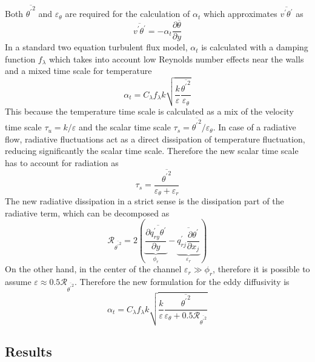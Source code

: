 \documentclass[10pt]{article}
\def\lp{\left(}
\def\rp{\right)}
\def\tp{\overline{{\theta^\prime}^2}}
\def\tm{\overline{\theta}}
\def\tr{{\theta^\prime}}
\def\et{{\varepsilon_{\theta}}}
\begin{document}
\noindent Both $\tp$ and $\et$ are required for the calculation of $\alpha_t$ which approximates $\overline{v^\prime \tr}$ as
\begin{equation*}
\overline{v^\prime \tr} = - \alpha_t \frac{\partial \tm}{\partial y}
\end{equation*}
In a standard two equation turbulent flux model, $\alpha_t$ is calculated with a damping function $f_{\lambda}$ which takes into account low Reynolds number effects near the walls and a mixed time scale for temperature
\begin{equation*}
\alpha_t = C_{\lambda} f_{\lambda} k \sqrt{\frac{k}{\varepsilon}\frac{\tp}{\et}}
\end{equation*} 
This because the temperature time scale is calculated as a mix of the velocity time scale $\tau_u= k/\varepsilon$ and the scalar time scale $\tau_s = \tp/\et$. In case of a radiative flow, radiative fluctuations act as a direct dissipation of temperature fluctuation, reducing significantly the scalar time scale. Therefore the new scalar time scale has to account for radiation as
\begin{equation*}
\tau_s = \frac{\tp}{\et + \varepsilon_r}
\end{equation*}
The new radiative dissipation in a strict sense is the dissipation part of the radiative term, which can be decomposed as
\begin{equation*}
\mathcal{R}_{\tp} = 2 \lp \underbrace{\frac{\partial \overline{q_{ry}^\prime \tr}}{\partial y}}_{\phi_r} - \underbrace{\overline{q_{rj}^\prime\frac{\partial \tr}{\partial x_j}}}_{\varepsilon_r} \rp
\end{equation*}
On the other hand, in the center of the channel $\varepsilon_r \gg \phi_r$, therefore it is possible to assume $\varepsilon \approx 0.5 \mathcal{R}_{\tp}$.
Therefore the new formulation for the eddy diffusivity is
\begin{equation*}
\alpha_t = C_{\lambda} f_{\lambda} k \sqrt{\frac{k}{\varepsilon}\frac{\tp}{\et+0.5\mathcal{R}_{\tp}}}
\end{equation*}
\subsection*{Results}
\end{document}
